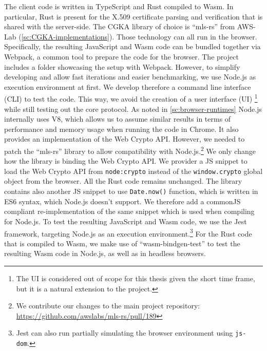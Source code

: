 The client code is written in TypeScript and Rust compiled to Wasm.
In particular, Rust is present for the X.509 certificate parsing and
verification that is shared with the server-side.
The CGKA library of choice is ``mls-rs'' from AWS-Lab (\cref{sc:CGKA-implementations}).
Those technology can all run in the browser. Specifically,
the resulting JavaScript and Wasm code can be bundled
together via Webpack, a common tool to prepare
the code for the browser.
The project includes a folder showcasing the setup with
Webpack.
However, to simplify developing and allow fast iterations and easier benchmarking,
we use Node.js as execution environment at first.
We develop therefore a command line interface (CLI) to test the code.
This way, we avoid the creation of a user
interface (UI)
\footnote{The UI is considered out of scope for this thesis given the short time frame, but it is a natural extension to the project.}
while still testing out the core protocol. 
As noted in \cref{sc:browser-runtimes}
Node.js internally uses V8, which allows us to assume
similar results in terms of performance and memory usage
when running the code in Chrome. It also provides
an implementation of the Web Crypto API.
However, we needed to patch the ``mls-rs'' library
to allow compatibility with Node.js.\footnote{We contribute our changes to the main project repository: \url{https://github.com/awslabs/mls-rs/pull/189}}
We only change how the library is binding the Web Crypto API.
We provider a JS snippet to load the Web Crypto API from
\texttt{node:crypto} instead of the \texttt{window.crypto} global
object from the browser. All the Rust code remains
unchanged. The library contains also another JS snippet
to use \texttt{Date.now()} function, which is written in
ES6 syntax, which Node.js doesn't support.
We therefore add a commonJS compliant re-implementation
of the same snippet which is used
when compiling for Node.js.
To test the resulting JavaScript and Wasm code, we use the Jest~\cite{Jest}
framework, targeting Node.js as an execution environment.\footnote{Jest can also run partially simulating the browser environment using \texttt{js-dom}.}
For the Rust code that is compiled to Wasm, we make use of
``wasm-bindgen-test'' to test the resulting Wasm code in 
Node.js, as well as in headless browsers.






